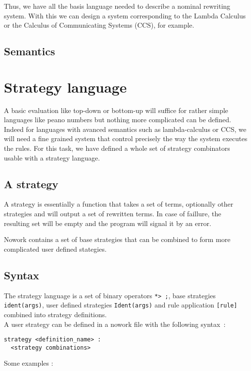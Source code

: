 \documentclass[12pt,a4paper]{article}
\begin{document}
Thus, we have all the basis language needed to describe a nominal
rewriting system. With this we can design a system
corresponding to the Lambda Calculus or the Calculus of Communicating
Systems (CCS), for example.

\subsection{Semantics}

\section{Strategy language}

A basic evaluation like top-down or bottom-up will suffice for rather simple
languages like peano numbers but nothing more complicated can be defined.
Indeed for languages with avanced semantics such as lambda-calculus or CCS, we 
will need a fine grained system that control precisely the way the system 
executes the rules. For this task, we have defined a whole set of strategy 
combinators usable with a strategy language.

\subsection{A strategy}
A strategy is essentially a function that takes a set of terms, optionally other
strategies and will output a set of rewritten terms. In case of faillure, the 
resulting set will be empty and the program will signal it by an error.

Nowork contains a set of base strategies that can be combined to form more
complicated user defined stategies.

\subsection{Syntax}
The strategy language is a set of binary operators \verb|*> ;|, base strategies 
\verb|ident(args)|, user defined strategies \verb|Ident(args)| and rule 
application \verb|[rule]| combined into strategy definitions.\\

A user strategy can be defined in a nowork file with the following syntax~:
\begin{verbatim}
strategy <definition_name> : 
  <strategy combinations>
\end{verbatim}

Some examples : 
\end{document}
